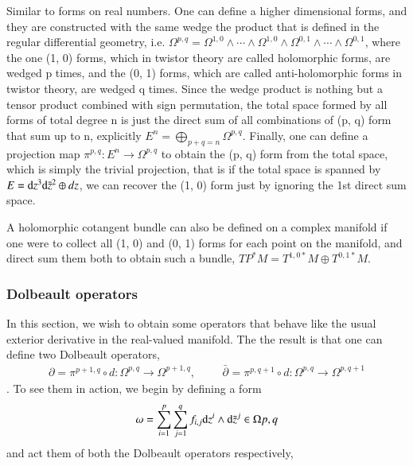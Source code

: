\documentclass{article}
\begin{document}
    Similar to forms on real numbers. One can define a higher
    dimensional forms, and they are constructed with the same wedge
    the product that is defined in the regular differential geometry, i.e. $
    \Omega^{p,q} = \Omega^{1,0} \wedge \cdots \wedge \Omega^{1,0} \wedge
    \Omega^{0,1} \wedge \cdots \wedge \Omega^{0,1} $, where the one (1,
    0) forms, which in twistor theory are called holomorphic
    forms, are wedged p times, and the (0, 1) forms, which are called
    anti-holomorphic forms in twistor theory, are wedged q times.
    Since the wedge product is nothing but a tensor product combined
    with sign permutation, the total space formed by all forms of total
    degree n is just the direct sum of all combinations of (p, q) form
    that sum up to n, explicitly $ E^n = \bigoplus_{ p+q=n }
    \Omega^{p,q}. $ Finally, one can define a projection map $
    \pi^{p,q}: E^n \to \Omega^{p,q} $ to obtain the (p, q) form from the
    total space, which is simply the trivial projection, that is if the
    total space is spanned by $ E = \textnormal{d}z^3
    \textnormal{d}\bar z^2 \oplus dz $, we can recover the (1, 0) form just by
    ignoring the 1st direct sum space.

    A holomorphic cotangent bundle can also be defined on a complex manifold
    if one were to collect all (1, 0) and (0, 1) forms for each point on
    the manifold, and direct sum them both to obtain such a bundle,
    $ TP^*M = T^{1,0 *}M \oplus T^{0, 1*}M. $

    \subsubsection{Dolbeault operators}%
      \label{sub: Dolbeault operators}
      In this section, we wish to obtain some operators that behave
      like the usual exterior derivative in the real-valued manifold. The
      the result is that one can define two Dolbeault operators, 
      \begin{align}
        \label{dolbeault operators}
        \partial = \pi^{p+1, q} \circ d : \Omega^{p,q} \to
        \Omega^{p+1, q}, \hspace{1cm} \bar \partial_{}^{} =
        \pi^{p, q+1} \circ d : \Omega^{p,q} \to \Omega^{p, q+1} 
      \end{align}. To see them in action, we begin by defining a form 
      \begin{align}
        \label{dolbeault on omega}
        \omega = \sum_{i = 1}^{p} \sum_{j=1}^{q} f_{i, j}
        \textnormal{d}z^i \wedge \textnormal{d} \bar z^j \in
        \Omega{p,q}
      \end{align}
      and act them of both the Dolbeault operators respectively,
\end{document}

